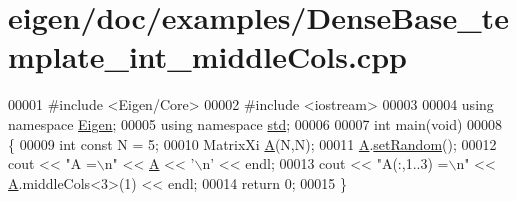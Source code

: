 \hypertarget{eigen_2doc_2examples_2_dense_base__template__int__middle_cols_8cpp_source}{}\section{eigen/doc/examples/\+Dense\+Base\+\_\+template\+\_\+int\+\_\+middle\+Cols.cpp}
\label{eigen_2doc_2examples_2_dense_base__template__int__middle_cols_8cpp_source}

\begin{DoxyCode}
00001 \textcolor{preprocessor}{#include <Eigen/Core>}
00002 \textcolor{preprocessor}{#include <iostream>}
00003 
00004 \textcolor{keyword}{using namespace }\hyperlink{namespace_eigen}{Eigen};
00005 \textcolor{keyword}{using namespace }\hyperlink{namespacestd}{std};
00006 
00007 \textcolor{keywordtype}{int} main(\textcolor{keywordtype}{void})
00008 \{
00009     \textcolor{keywordtype}{int} \textcolor{keyword}{const} N = 5;
00010     MatrixXi \hyperlink{group___core___module_class_eigen_1_1_matrix}{A}(N,N);
00011     \hyperlink{group___core___module_class_eigen_1_1_matrix}{A}.\hyperlink{class_eigen_1_1_plain_object_base_af0e576a0e1aefc9ee346de44cc352ba3}{setRandom}();
00012     cout << \textcolor{stringliteral}{"A =\(\backslash\)n"} << \hyperlink{group___core___module_class_eigen_1_1_matrix}{A} << \textcolor{charliteral}{'\(\backslash\)n'} << endl;
00013     cout << \textcolor{stringliteral}{"A(:,1..3) =\(\backslash\)n"} << \hyperlink{group___core___module_class_eigen_1_1_matrix}{A}.middleCols<3>(1) << endl;
00014     \textcolor{keywordflow}{return} 0;
00015 \}
\end{DoxyCode}

